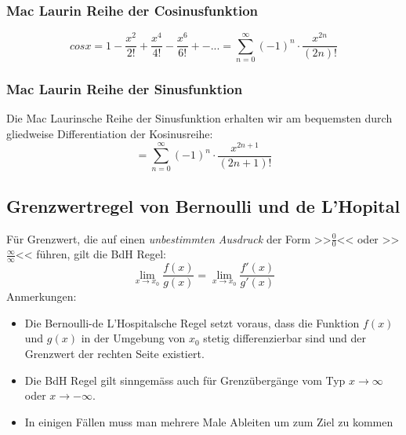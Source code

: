 \subsubsection*{Mac Laurin Reihe der Cosinusfunktion}
$$cos x = 1 - \frac{x^2}{2!} + \frac{x^4}{4!} - \frac{x^6}{6!} +- ... =  \sum\limits_{n=0}^{\infty}(-1)^n \cdot \frac{x^{2n}}{(2n)!}$$

\subsubsection*{Mac Laurin Reihe der Sinusfunktion}
Die Mac Laurinsche Reihe der Sinusfunktion erhalten wir am bequemsten durch gliedweise Differentiation der Kosinusreihe:
$$ = \sum\limits_{n=0}^{\infty} (-1)^n \cdot \frac{x^{2n+1}}{(2n+1)!}$$


\subsection{Grenzwertregel von Bernoulli und de L'Hopital}
\begin{definition}
Für Grenzwert, die auf einen \textit{unbestimmten Ausdruck} der Form >>$\frac{0}{0}$<< oder >>$\frac{\infty}{\infty}$<< führen, gilt die BdH Regel:
$$\lim\limits_{x \rightarrow x_0} \frac{f(x)}{g(x)} = \lim\limits_{x \rightarrow x_0} \frac{f'(x)}{g'(x)}$$
Anmerkungen:
\begin{itemize}
	\item Die Bernoulli-de L'Hospitalsche Regel setzt voraus, dass die Funktion $f(x)$ und $g(x)$ in der Umgebung von $x_0$ stetig differenzierbar sind und der Grenzwert der rechten Seite existiert.
	\item Die BdH Regel gilt sinngemäss auch für Grenzübergänge vom Typ $x \rightarrow \infty$ oder $x \rightarrow -\infty$.
	\item In einigen Fällen muss man mehrere Male Ableiten um zum Ziel zu kommen
\end{itemize}
\end{definition}

